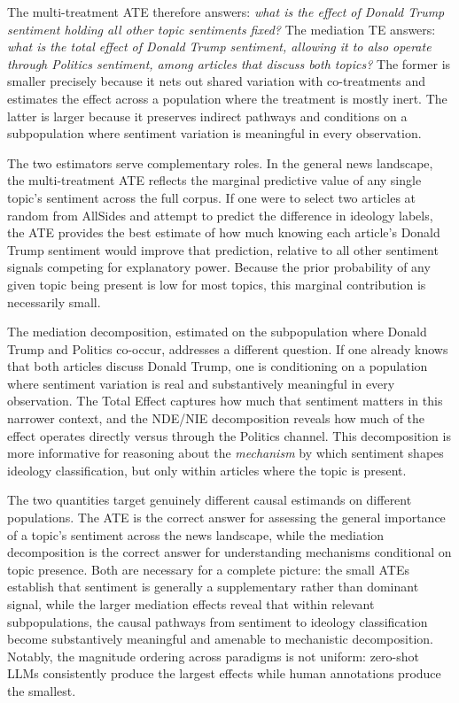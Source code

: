 The multi-treatment ATE therefore answers: \emph{what is the effect of Donald Trump sentiment holding all other topic sentiments fixed?} The mediation TE answers: \emph{what is the total effect of Donald Trump sentiment, allowing it to also operate through Politics sentiment, among articles that discuss both topics?} The former is smaller precisely because it nets out shared variation with co-treatments and estimates the effect across a population where the treatment is mostly inert. The latter is larger because it preserves indirect pathways and conditions on a subpopulation where sentiment variation is meaningful in every observation.

The two estimators serve complementary roles. In the general news landscape, the multi-treatment ATE reflects the marginal predictive value of any single topic's sentiment across the full corpus. If one were to select two articles at random from AllSides and attempt to predict the difference in ideology labels, the ATE provides the best estimate of how much knowing each article's Donald Trump sentiment would improve that prediction, relative to all other sentiment signals competing for explanatory power. Because the prior probability of any given topic being present is low for most topics, this marginal contribution is necessarily small.

The mediation decomposition, estimated on the subpopulation where Donald Trump and Politics co-occur, addresses a different question. If one already knows that both articles discuss Donald Trump, one is conditioning on a population where sentiment variation is real and substantively meaningful in every observation. The Total Effect captures how much that sentiment matters in this narrower context, and the NDE/NIE decomposition reveals how much of the effect operates directly versus through the Politics channel. This decomposition is more informative for reasoning about the \emph{mechanism} by which sentiment shapes ideology classification, but only within articles where the topic is present.

The two quantities target genuinely different causal estimands on different populations. The ATE is the correct answer for assessing the general importance of a topic's sentiment across the news landscape, while the mediation decomposition is the correct answer for understanding mechanisms conditional on topic presence. Both are necessary for a complete picture: the small ATEs establish that sentiment is generally a supplementary rather than dominant signal, while the larger mediation effects reveal that within relevant subpopulations, the causal pathways from sentiment to ideology classification become substantively meaningful and amenable to mechanistic decomposition. Notably, the magnitude ordering across paradigms is not uniform: zero-shot LLMs consistently produce the largest effects while human annotations produce the smallest.

